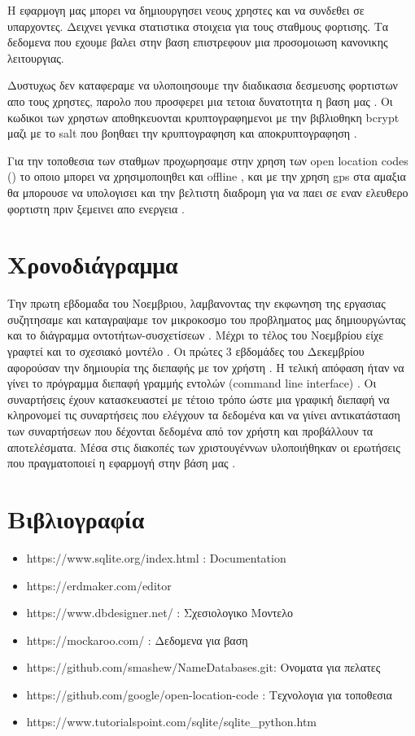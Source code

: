 \documentclass[manuscript,screen,review]{acmart}
\newcommand{\en}[1]{\foreignlanguage{english}{#1}}
\begin{document}
Η εφαρμογη μας μπορει να δημιουργησει νεους χρηστες και να συνδεθει σε υπαρχοντες. Δειχνει γενικα στατιστικα στοιχεια για τους σταθμους φορτισης. Τα δεδομενα που εχουμε βαλει στην βαση επιστρεφουν μια προσομοιωση κανονικης λειτουργιας.

Δυστυχως δεν καταφεραμε να υλοποιησουμε την διαδικασια δεσμευσης φορτιστων απο τους χρηστες, παρολο που προσφερει μια τετοια δυνατοτητα η βαση μας .
Οι κωδικοι των χρηστων αποθηκευονται κρυπτογραφημενοι με την βιβλιοθηκη \en{bcrypt} μαζι με το \en{salt} που βοηθαει την κρυπτογραφηση και αποκρυπτογραφηση . 

Για την τοποθεσια των σταθμων προχωρησαμε στην χρηση των open \en{location codes ()} το οποιο μπορει να χρησιμοποιηθει και \en{offline} , και με την χρηση \en{gps} στα αμαξια θα μπορουσε να υπολογισει και την βελτιστη διαδρομη για να παει σε εναν ελευθερο φορτιστη πριν ξεμεινει απο ενεργεια . 



\section{Χρονοδιάγραμμα}

Την πρωτη εβδομαδα του Νοεμβριου, λαμβανοντας την εκφωνηση της εργασιας συζητησαμε και καταγραψαμε τον μικροκοσμο του προβληματος μας δημιουργώντας και το διάγραμμα οντοτήτων-συσχετίσεων . Μέχρι το τέλος του Νοεμβρίου είχε γραφτεί και το σχεσιακό μοντέλο  . 
Οι πρώτες 3 εβδομάδες του Δεκεμβρίου αφορούσαν την δημιουρία της διεπαφής με τον χρήστη . Η τελική απόφαση ήταν να γίνει το πρόγραμμα διεπαφή γραμμής εντολών (\en{command line interface}) . Οι συναρτήσεις έχουν κατασκευαστεί με τέτοιο τρόπο ώστε μια γραφική διεπαφή να κληρονομεί τις συναρτήσεις που ελέγχουν τα δεδομένα και να γιίνει αντικατάσταση των συναρτήσεων που δέχονται δεδομένα από τον χρήστη και προβάλλουν τα αποτελέσματα. 
Μέσα στις διακοπές των χριστουγέννων υλοποιήθηκαν οι ερωτήσεις που πραγματοποιεί η εφαρμογή στην βάση μας .



\section{Βιβλιογραφία}
\begin{itemize}
    

      \item \en{https://www.sqlite.org/index.html} : \en{Documentation}
      \item \en{https://erdmaker.com/editor} 
      \item \en{https://www.dbdesigner.net/} : Σχεσιολογικο Μοντελο 
      \item \en{https://mockaroo.com/} : Δεδομενα για βαση
      \item \en{https://github.com/smashew/NameDatabases.git}: Ονοματα για πελατες
      \item \en{https://github.com/google/open-location-code} : Τεχνολογια για τοποθεσια 
      \item \en{https://www.tutorialspoint.com/sqlite/sqlite\_python.htm}
      
      
\end{itemize}
\end{document}
